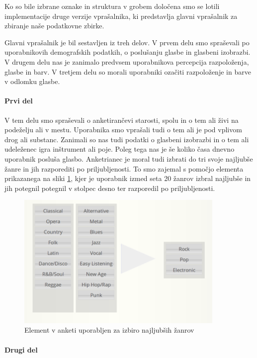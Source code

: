 \documentclass[a4paper, 12pt]{book}
\begin{document}
{Ko so bile izbrane oznake in struktura v grobem določena smo se lotili implementacije druge verzije vprašalnika, ki predstavlja glavni vprašalnik za zbiranje naše podatkovne zbirke. 

Glavni vprašalnik je bil sestavljen iz treh delov. V prvem delu smo spraševali po uporabnikovih demografskih podatkih, o poslušanju glasbe in glasbeni izobrazbi. V drugem delu nas je zanimalo predvsem uporabnikova percepcija razpoloženja, glasbe in barv. V tretjem delu so morali uporabniki ozačiti razpoloženje in barve v odlomku glasbe. 

\paragraph{Prvi del}

V tem delu smo spraševali o anketirančevi starosti, spolu in o tem ali živi na podeželju ali v mestu. Uporabnika smo vprašali tudi o tem ali je pod vplivom drog ali substanc. Zanimali so nas tudi podatki o glasbeni izobrazbi in o tem ali udeleženec igra inštrument ali poje. Poleg tega nas je še koliko časa dnevno uporabnik posluša glasbo. Anketrianec je moral tudi izbrati do tri svoje najljubše žanre in jih razporediti po priljubljenosti. To smo zajemal s pomočjo elementa prikazanega na sliki \ref{genresel}, kjer je uporabnik izmed seta 20 žanrov izbral najljubše in jih potegnil potegnil v stolpec desno ter razporedil po priljubljenosti. 

\begin{figure}[h!t]
\centering
\includegraphics[width=10cm]{genresel.png}

\caption{Element v anketi uporabljen za izbiro najljubših žanrov}
\label{genresel}
\end{figure}

\paragraph{Drugi del}

}
\end{document}
